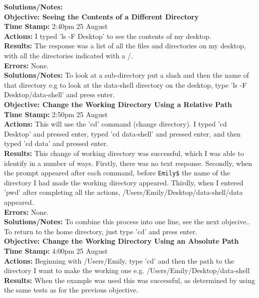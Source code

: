 \documentclass{article}
\begin{document}
\begin{FlushLeft}
\textbf{Solutions/Notes:}\\
\vspace{5mm}
\textbf{Objective: Seeing the Contents of a Different Directory}\\ 
\textbf{Time Stamp:} 2:40pm 25 August\\
\textbf{Actions:} I typed 'ls -F Desktop' to see the contents of my desktop. \\
\textbf{Results:} The response was a list of all the files and directories on my desktop, with all the directories indicated with a /. \\
\textbf{Errors:} None.\\
\textbf{Solutions/Notes:} To look at a sub-directory put a slash and then the name of that directory e.g to look at the data-shell directory on the desktop, type 'ls -F Desktop/data-shell' and press enter.\\
\vspace{5mm}
\textbf{Objective: Change the Working Directory Using a Relative Path}\\
\textbf{Time Stamp:} 2:50pm 25 August\\
\textbf{Actions:} This will use the 'cd' command (change directory). I typed 'cd Desktop' and pressed enter, typed 'cd data-shell' and pressed enter, and then typed 'cd data' and pressed enter.\\
\textbf{Results:} This change of working directory was successful, which I was able to identify in a number of ways. Firstly, there was no text response. Secondly, when the prompt appeared after each command, before \verb|Emily$| the name of the directory I had made the working directory appeared. Thirdly, when I entered 'pwd' after completing all the actions, /Users/Emily/Desktop/data-shell/data appeared. \\
\textbf{Errors:} None.\\
\textbf{Solutions/Notes:} To combine this process into one line, see the next objecive.. To return to the home directory, just type 'cd' and press enter.\\
\vspace{5mm}
\textbf{Objective: Change the Working Directory Using an Absolute Path}\label{absolute}\\ 
\textbf{Time Stamp:} 4:00pm 25 August\\
\textbf{Actions:} Beginning with /Users/Emily, type 'cd' and then the path to the directory I want to make the working one e.g. /Users/Emily/Desktop/data-shell \\
\textbf{Results:} When the example was used this was successful, as determined by using the same tests as for the previous objective.\\

\end{FlushLeft}
\end{document}
